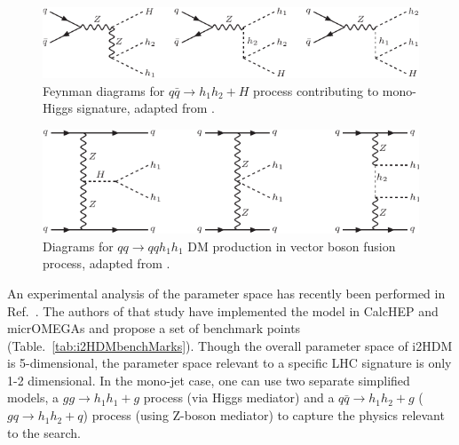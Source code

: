 \begin{figure}[htb]
\includegraphics[width=\textwidth]{figures/EW/i2HDM/fd-mono-h2.pdf} 
\caption{Feynman diagrams for $q\bar{q}\to h_1 h_2+H$  process 
contributing to mono-Higgs signature, adapted from \cite{Belyaev:2015tap}.}
\label{fig:fdmonoH2}
\end{figure}
\begin{figure}[htb]
\includegraphics[width=\textwidth]{figures/EW/i2HDM/fd-vbf.pdf} 
\caption{Diagrams for $qq\to qq h_1 h_1$ DM production in vector boson
fusion process, adapted from \cite{Belyaev:2015tap}.}
\label{fig:fdvbf}
\end{figure}

An experimental analysis of the parameter space has recently been
performed in Ref.~\cite{Belyaev:2015tap}. The authors of that study
have implemented the model in CalcHEP and micrOMEGAs and propose a set
of benchmark points (Table.~\ref{tab:i2HDMbenchMarks}). Though the
overall parameter space of i2HDM is 5-dimensional, the parameter space
relevant to a specific LHC signature is only 1-2 dimensional. In the
mono-jet case, one can use two separate simplified models, a
$gg\to h_1 h_1+g$ process (via Higgs mediator) and a
$q\bar{q}\to h_1 h_2+g$ ($gq\to h_1 h_2+q$) process (using Z-boson
mediator) to capture the physics relevant to the search.


